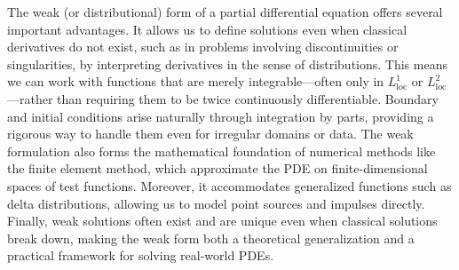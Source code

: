 \documentclass[11pt,a4paper]{article}
\begin{document}
The weak (or distributional) form of a partial differential equation offers several important advantages. 
It allows us to define solutions even when classical derivatives do not exist, such as in problems involving 
discontinuities or singularities, by interpreting derivatives in the sense of distributions. 
This means we can work with functions that are merely integrable---often only in 
$L^1_{\text{loc}}$ or $L^2_{\text{loc}}$---rather than requiring them to be twice continuously differentiable. 
Boundary and initial conditions arise naturally through integration by parts, providing a rigorous way 
to handle them even for irregular domains or data. 
The weak formulation also forms the mathematical foundation of numerical methods like the finite element method, 
which approximate the PDE on finite-dimensional spaces of test functions. 
Moreover, it accommodates generalized functions such as delta distributions, allowing us to model point sources 
and impulses directly. 
Finally, weak solutions often exist and are unique even when classical solutions break down, 
making the weak form both a theoretical generalization and a practical framework for solving real-world PDEs.
\newline
\end{document}
